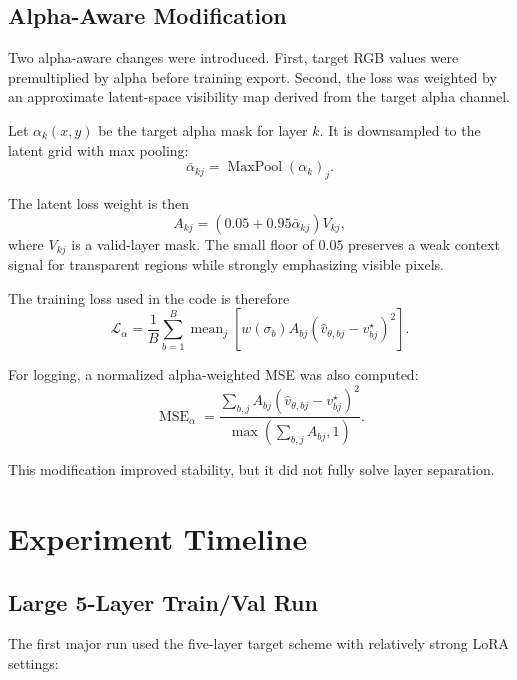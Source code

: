 \documentclass[11pt]{article}
\begin{document}
\subsection{Alpha-Aware Modification}

Two alpha-aware changes were introduced. First, target RGB values were premultiplied
by alpha before training export. Second, the loss was weighted by an approximate
latent-space visibility map derived from the target alpha channel.

Let $\alpha_k(x,y)$ be the target alpha mask for layer $k$. It is downsampled to
the latent grid with max pooling:
\begin{equation}
\bar{\alpha}_{kj}
=
\operatorname{MaxPool}(\alpha_k)_j.
\end{equation}

The latent loss weight is then
\begin{equation}
A_{kj}
=
\left(0.05 + 0.95\bar{\alpha}_{kj}\right)V_{kj},
\end{equation}
where $V_{kj}$ is a valid-layer mask. The small floor of $0.05$ preserves a weak
context signal for transparent regions while strongly emphasizing visible pixels.

The training loss used in the code is therefore
\begin{equation}
\mathcal{L}_{\alpha}
=
\frac{1}{B}
\sum_{b=1}^{B}
\operatorname{mean}_{j}
\left[
w(\sigma_b)
A_{bj}
\left(
\hat{v}_{\theta,bj}-v^\star_{bj}
\right)^2
\right].
\end{equation}

For logging, a normalized alpha-weighted MSE was also computed:
\begin{equation}
\operatorname{MSE}_{\alpha}
=
\frac{
\sum_{b,j}
A_{bj}
\left(
\hat{v}_{\theta,bj}-v^\star_{bj}
\right)^2
}{
\max\left(\sum_{b,j}A_{bj},1\right)
}.
\end{equation}

This modification improved stability, but it did not fully solve layer separation.

\section{Experiment Timeline}

\subsection{Large 5-Layer Train/Val Run}

The first major run used the five-layer target scheme with relatively strong LoRA
settings:
\end{document}
